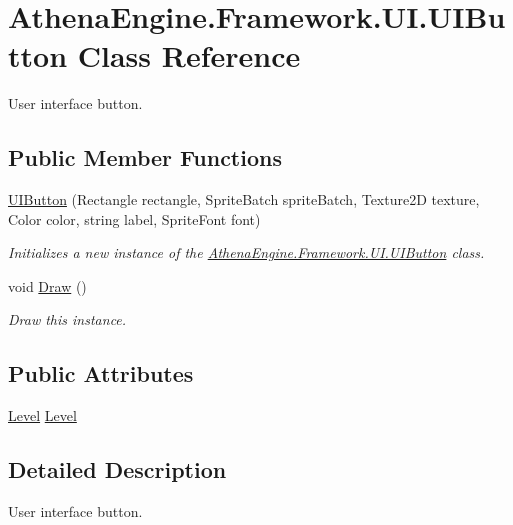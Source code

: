 \hypertarget{class_athena_engine_1_1_framework_1_1_u_i_1_1_u_i_button}{\section{Athena\-Engine.\-Framework.\-U\-I.\-U\-I\-Button Class Reference}
\label{class_athena_engine_1_1_framework_1_1_u_i_1_1_u_i_button}
}


User interface button.  


\subsection*{Public Member Functions}
\begin{DoxyCompactItemize}
\item 
\hyperlink{class_athena_engine_1_1_framework_1_1_u_i_1_1_u_i_button_aa12071215630be5fd4a57b32c45867d2}{U\-I\-Button} (Rectangle rectangle, Sprite\-Batch sprite\-Batch, Texture2\-D texture, Color color, string label, Sprite\-Font font)
\begin{DoxyCompactList}\small\item\em Initializes a new instance of the \hyperlink{class_athena_engine_1_1_framework_1_1_u_i_1_1_u_i_button}{Athena\-Engine.\-Framework.\-U\-I.\-U\-I\-Button} class. \end{DoxyCompactList}\item 
void \hyperlink{class_athena_engine_1_1_framework_1_1_u_i_1_1_u_i_button_a825a19a8539070d7ec354774d1808089}{Draw} ()
\begin{DoxyCompactList}\small\item\em Draw this instance. \end{DoxyCompactList}\end{DoxyCompactItemize}
\subsection*{Public Attributes}
\begin{DoxyCompactItemize}
\item 
\hyperlink{class_athena_engine_1_1_framework_1_1_gameplay_1_1_level}{Level} \hyperlink{class_athena_engine_1_1_framework_1_1_u_i_1_1_u_i_button_a11fe0fd5a2e15a336ca9a42d779dd3a3}{Level}
\end{DoxyCompactItemize}


\subsection{Detailed Description}
User interface button. 



